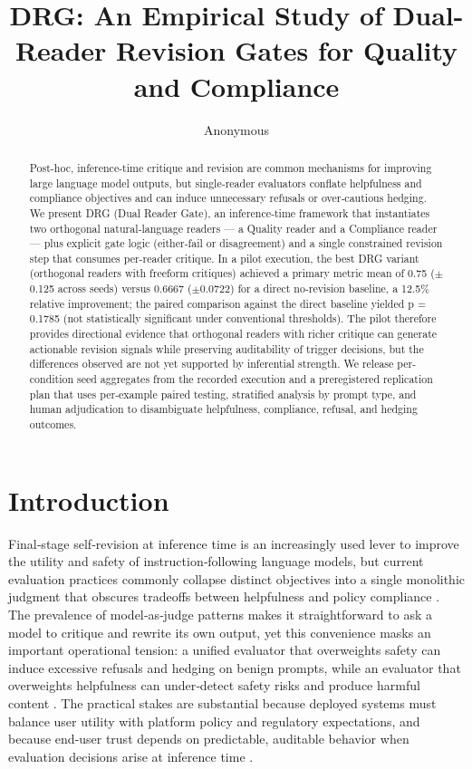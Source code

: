 \documentclass{article}
\title{DRG: An Empirical Study of Dual-Reader Revision Gates for Quality and Compliance}
\author{Anonymous}
\begin{document}
\begin{abstract}
Post-hoc, inference-time critique and revision are common mechanisms for improving large language model outputs, but single‑reader evaluators conflate helpfulness and compliance objectives and can induce unnecessary refusals or over‑cautious hedging. We present DRG (Dual Reader Gate), an inference‑time framework that instantiates two orthogonal natural‑language readers --- a Quality reader and a Compliance reader --- plus explicit gate logic (either-fail or disagreement) and a single constrained revision step that consumes per-reader critique. In a pilot execution, the best DRG variant (orthogonal readers with freeform critiques) achieved a primary metric mean of 0.75 ($\pm$0.125 across seeds) versus 0.6667 ($\pm$0.0722) for a direct no‑revision baseline, a 12.5\% relative improvement; the paired comparison against the direct baseline yielded p = 0.1785 (not statistically significant under conventional thresholds). The pilot therefore provides directional evidence that orthogonal readers with richer critique can generate actionable revision signals while preserving auditability of trigger decisions, but the differences observed are not yet supported by inferential strength. We release per-condition seed aggregates from the recorded execution and a preregistered replication plan that uses per‑example paired testing, stratified analysis by prompt type, and human adjudication to disambiguate helpfulness, compliance, refusal, and hedging outcomes.
\end{abstract}

\maketitle

\section{Introduction}

\label{sec:introduction}

Final‑stage self‑revision at inference time is an increasingly used lever to improve the utility and safety of instruction‑following language models, but current evaluation practices commonly collapse distinct objectives into a single monolithic judgment that obscures tradeoffs between helpfulness and policy compliance \cite{zhao2023survey}. The prevalence of model‑as‑judge patterns makes it straightforward to ask a model to critique and rewrite its own output, yet this convenience masks an important operational tension: a unified evaluator that overweights safety can induce excessive refusals and hedging on benign prompts, while an evaluator that overweights helpfulness can under‑detect safety risks and produce harmful content \cite{cui2023harmlessness}. The practical stakes are substantial because deployed systems must balance user utility with platform policy and regulatory expectations, and because end‑user trust depends on predictable, auditable behavior when evaluation decisions arise at inference time \cite{ivgi2024loops, bubeck2023sparks}.
\end{document}
